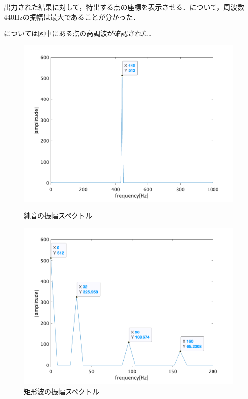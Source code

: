 \result
出力された結果に対して，特出する点の座標を表示させる．について，周波数\(440\textrm{Hz}\)の振幅は最大であることが分かった．\par
{}については図中にある点の高調波が確認された．
\begin{figure}[h]
    \centering
    \begin{minipage}{.48\textwidth}
        \centering
        \includegraphics[keepaspectratio,width=\textwidth]{../../Figures/02_01.png}
        \caption{純音の振幅スペクトル}
        \label{fig:\kadaiba_純音の振幅スペクトル}
    \end{minipage}
    \begin{minipage}{.48\textwidth}
        \centering
        \includegraphics[keepaspectratio,width=\textwidth]{../../Figures/02_022.png}
        \caption{矩形波の振幅スペクトル}
        \label{fig:\kadaiba_矩形波の振幅スペクトル}
    \end{minipage}
\end{figure}
\consideration

